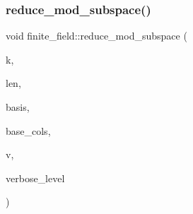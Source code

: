 \mbox{\label{classfinite__field_a58c58854e54819ab1f3b1df2a12423ad}} 
\subsubsection{\texorpdfstring{reduce\+\_\+mod\+\_\+subspace()}{reduce\_mod\_subspace()}}
{\footnotesize\ttfamily void finite\+\_\+field\+::reduce\+\_\+mod\+\_\+subspace (\begin{DoxyParamCaption}\item[{\mbox{\hyperlink{galois_8h_a09fddde158a3a20bd2dcadb609de11dc}{I\+NT}}}]{k,  }\item[{\mbox{\hyperlink{galois_8h_a09fddde158a3a20bd2dcadb609de11dc}{I\+NT}}}]{len,  }\item[{\mbox{\hyperlink{galois_8h_a09fddde158a3a20bd2dcadb609de11dc}{I\+NT}} $\ast$}]{basis,  }\item[{\mbox{\hyperlink{galois_8h_a09fddde158a3a20bd2dcadb609de11dc}{I\+NT}} $\ast$}]{base\+\_\+cols,  }\item[{\mbox{\hyperlink{galois_8h_a09fddde158a3a20bd2dcadb609de11dc}{I\+NT}} $\ast$}]{v,  }\item[{\mbox{\hyperlink{galois_8h_a09fddde158a3a20bd2dcadb609de11dc}{I\+NT}}}]{verbose\+\_\+level }\end{DoxyParamCaption})}

\mbox{\label{classfinite__field_a544f968b15eb1f702097f41e01db256a}} 
